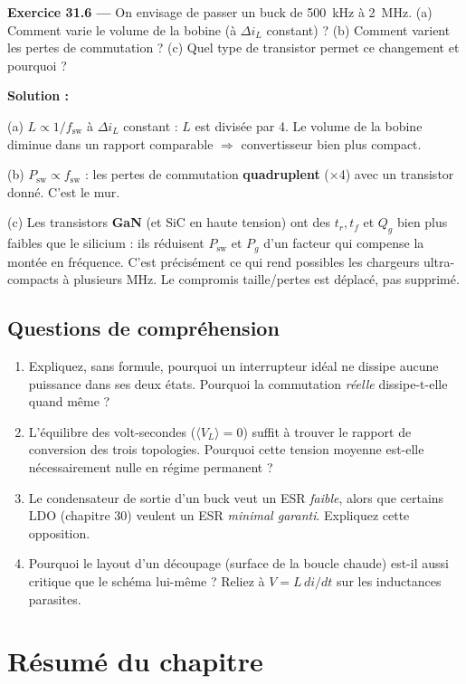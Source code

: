\documentclass[12pt,a4paper,twoside]{book}
\begin{document}
\textbf{Exercice 31.6 ---} On envisage de passer un buck de \SI{500}{kHz} à \SI{2}{MHz}. (a) Comment varie le volume de la bobine (à $\Delta i_L$ constant) ? (b) Comment varient les pertes de commutation ? (c) Quel type de transistor permet ce changement et pourquoi ?

\begin{pratique}
\textbf{Solution :}

(a) $L \propto 1/f_{\text{sw}}$ à $\Delta i_L$ constant : $L$ est divisée par 4. Le volume de la bobine diminue dans un rapport comparable $\Rightarrow$ convertisseur bien plus compact.

(b) $P_{\text{sw}} \propto f_{\text{sw}}$ : les pertes de commutation \textbf{quadruplent} (×4) avec un transistor donné. C'est le mur.

(c) Les transistors \textbf{GaN} (et SiC en haute tension) ont des $t_r, t_f$ et $Q_g$ bien plus faibles que le silicium : ils réduisent $P_{\text{sw}}$ et $P_g$ d'un facteur qui compense la montée en fréquence. C'est précisément ce qui rend possibles les chargeurs ultra-compacts à plusieurs MHz. Le compromis taille/pertes est déplacé, pas supprimé.
\end{pratique}

\subsection*{Questions de compréhension}

\begin{enumerate}[nosep]
\item Expliquez, sans formule, pourquoi un interrupteur idéal ne dissipe aucune puissance dans ses deux états. Pourquoi la commutation \textit{réelle} dissipe-t-elle quand même ?
\item L'équilibre des volt-secondes ($\langle V_L\rangle = 0$) suffit à trouver le rapport de conversion des trois topologies. Pourquoi cette tension moyenne est-elle nécessairement nulle en régime permanent ?
\item Le condensateur de sortie d'un buck veut un ESR \textit{faible}, alors que certains LDO (chapitre 30) veulent un ESR \textit{minimal garanti}. Expliquez cette opposition.
\item Pourquoi le layout d'un découpage (surface de la boucle chaude) est-il aussi critique que le schéma lui-même ? Reliez à $V = L\,di/dt$ sur les inductances parasites.
\end{enumerate}

\section*{Résumé du chapitre}
\end{document}
